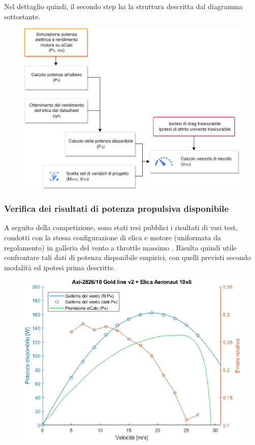 \documentclass[12pt]{article}
\begin{document}
\noindent
Nel dettaglio quindi, il secondo step ha la struttura descritta dal diagramma sottostante.
\begin{figure}[h]
	\centering
	\includegraphics[width=11.6cm]{img/dim-vto-v2}
\end{figure}

\subsubsection{Verifica dei risultati di potenza propulsiva disponibile}
A seguito della competizione, sono stati resi pubblici i risultati di vari test, condotti con la stessa configurazione di elica e motore (uniformata da regolamento) in galleria del vento a throttle massimo \cite{windtunnel}. Risulta quindi utile confrontare tali dati di potenza disponibile empirici, con quelli previsti secondo modalità ed ipotesi prima descritte.

\begin{figure}[h]
	\centering
	\includegraphics[width=13cm]{img/plot-PA-crop}
\end{figure}
\end{document}
